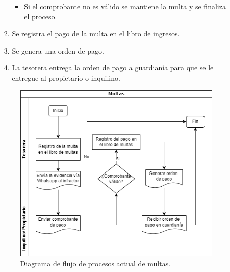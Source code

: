 \begin{itemize}
\begin{enumerate}
\begin{enumerate}
\begin{itemize}
                \item Si el comprobante no es válido se mantiene la multa y se finaliza el proceso.
            \end{itemize}
            \item Se registra el pago de la multa en el libro de ingresos.
            \item Se genera una orden de pago.
            \item La tesorera entrega la orden de pago a guardianía para que se le entregue al propietario o inquilino.
        \end{enumerate}
        \begin{figure}[H]
            \centering
            \includegraphics[width=1\textwidth]{resources/images/Diagrama de flujo de proceso multas actual}
            \caption{Diagrama de flujo de procesos actual de multas.}
            \label{fig:flujo-proceso-actual-multas}
        \end{figure}
    \end{enumerate}
\end{itemize}

